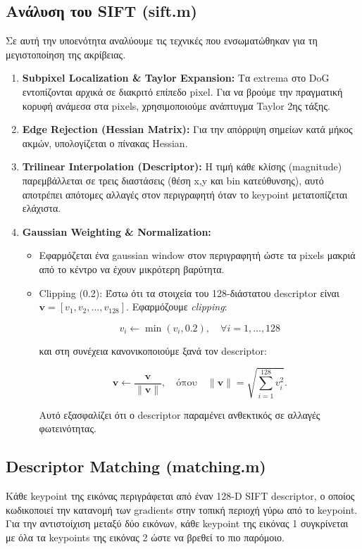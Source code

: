 \documentclass[12pt]{article}
\begin{document}
\subsection{Ανάλυση του SIFT (sift.m)}
Σε αυτή την υποενότητα αναλύουμε τις τεχνικές που ενσωματώθηκαν  για τη μεγιστοποίηση της ακρίβειας.
\begin{enumerate}
  \item \textbf{Subpixel Localization \& Taylor Expansion: }Τα extrema στο
   DoG εντοπίζονται αρχικά σε διακριτό επίπεδο pixel. Για να βρούμε την πραγματική κορυφή ανάμεσα στα pixels, χρησιμοποιούμε ανάπτυγμα Taylor 2ης τάξης.
  \item \textbf{Edge Rejection (Hessian Matrix): } Για την απόρριψη σημείων κατά μήκος ακμών, υπολογίζεται ο πίνακας Hessian.
  \item \textbf{Trilinear Interpolation (Descriptor): }Η τιμή κάθε κλίσης (magnitude) παρεμβάλλεται σε τρεις διαστάσεις (θέση x,y και bin κατεύθυνσης),
   αυτό αποτρέπει απότομες αλλαγές στον περιγραφητή όταν το keypoint μετατοπίζεται ελάχιστα.
   \item \textbf{Gaussian Weighting \& Normalization: }
      \begin{itemize}
        \item Εφαρμόζεται ένα gaussian window στον περιγραφητή ώστε τα pixels μακριά από το κέντρο να έχουν μικρότερη βαρύτητα.
        \item Clipping (0.2): Έστω ότι τα στοιχεία του 128-διάστατου descriptor είναι 
        $\mathbf{v} = [v_1, v_2, \dots, v_{128}]$. 
        Εφαρμόζουμε \textit{clipping}:
        
        \[
        v_i \leftarrow \min(v_i, 0.2), \quad \forall i = 1, \dots, 128
        \]
        
        και στη συνέχεια κανονικοποιούμε ξανά τον descriptor:
        
        \[
        \mathbf{v} \leftarrow \frac{\mathbf{v}}{\|\mathbf{v}\|}, \quad \text{όπου} \quad \|\mathbf{v}\| = \sqrt{\sum_{i=1}^{128} v_i^2}.
        \]
        
        Αυτό εξασφαλίζει ότι ο descriptor παραμένει ανθεκτικός σε αλλαγές φωτεινότητας.
        
      \end{itemize}
\end{enumerate}



\subsection{Descriptor Matching (matching.m)}
Κάθε keypoint της εικόνας περιγράφεται από έναν 128-D SIFT descriptor, ο οποίος κωδικοποιεί την κατανομή των gradients στην τοπική περιοχή γύρω από το 
keypoint. 
Για την αντιστοίχιση μεταξύ δύο εικόνων, κάθε keypoint της εικόνας 1 συγκρίνεται με όλα τα keypoints της εικόνας 2 ώστε να βρεθεί το πιο παρόμοιο.
\end{document}
